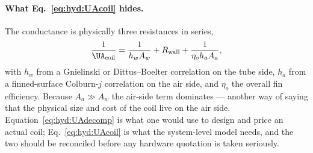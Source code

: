 \paragraph{What Eq.~\eqref{eq:hyd:UAcoil} hides.} The conductance is physically three
resistances in series,
\begin{equation}
\frac{1}{\UA_{\mathrm{coil}}}
=\frac{1}{h_w A_w}+R_{\mathrm{wall}}+\frac{1}{\eta_o h_a A_a},
\label{eq:hyd:UAdecomp}
\end{equation}
with $h_w$ from a Gnielinski or Dittus--Boelter correlation on the tube side, $h_a$ from a
finned-surface Colburn-$j$ correlation on the air side, and $\eta_o$ the overall fin
efficiency. Because $A_a\gg A_w$ the air-side term dominates --- another way of saying that the
physical size and cost of the coil live on the air side. Equation~\eqref{eq:hyd:UAdecomp} is
what one would use to design and price an actual coil; Eq.~\eqref{eq:hyd:UAcoil} is what the
system-level model needs, and the two should be reconciled before any hardware quotation is
taken seriously.
